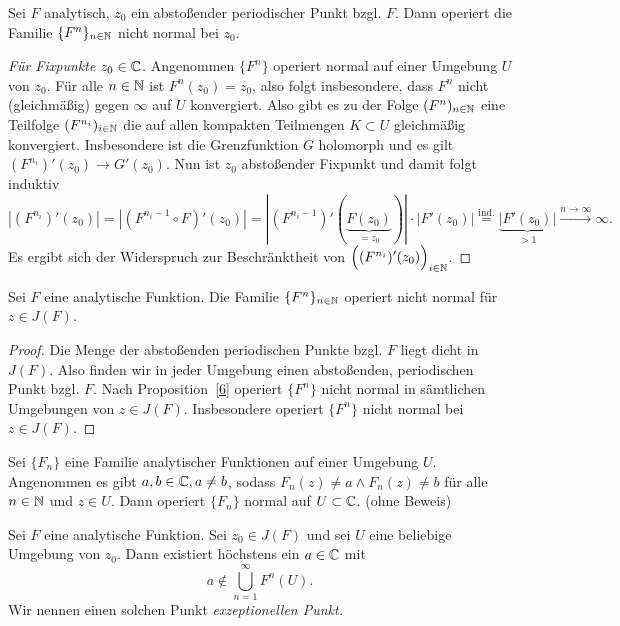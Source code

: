 \documentclass{mywork}
\begin{document}
\begin{prop}\label{6}
Sei $F$ analytisch, $z_0$ ein abstoßender periodischer Punkt bzgl. $F$. Dann operiert die Familie $\{F^n\}_{n\in \mathbb{N}}$ nicht normal bei $z_0$.
\end{prop}
\begin{proof}[Für Fixpunkte $z_0\in \mathbb{C}$]
 Angenommen $\{F^n\}$ operiert normal auf einer Umgebung $U$ von $z_0$. Für alle $n\in \mathbb{N}$ ist $F^n(z_0)=z_0$, also folgt insbesondere, dass $F^n$ nicht (gleichmäßig) gegen $\infty$ auf $U$ konvergiert. Also gibt es zu der Folge $(F^n)_{n\in \mathbb{N}}$ eine Teilfolge $(F^{n_i})_{i\in \mathbb{N}}$ die auf allen kompakten Teilmengen $K\subset U$ gleichmäßig konvergiert. Insbesondere ist die Grenzfunktion $G$ holomorph und es gilt $(F^{n_i})'(z_0) \to G'(z_0)$. Nun ist $z_0$ abstoßender Fixpunkt und damit folgt induktiv
 \[
 	|(F^{n_i})'(z_0)|=|(F^{n_i-1} \circ F)'(z_0)|=|(F^{n_i-1})'(\underbrace{F(z_0)}_{=z_0})|\cdot |F'(z_0)| \stackrel{\text{ind.}}{=} \underbrace{|F'(z_0)|}_{>1} \stackrel{n\to \infty}\to \infty.
 \]
 Es ergibt sich der Widerspruch zur Beschränktheit von $\Big((F^{n_i})'(z_0)\Big)_{i\in \mathbb{N}}$.
\end{proof}



\begin{kor} \label{7}
Sei $F$ eine analytische Funktion. Die Familie $\{F^n\}_{n\in \mathbb{N}}$ operiert nicht normal für $z\in J(F)$.
\end{kor}

\begin{proof}
Die Menge der abstoßenden periodischen Punkte bzgl. $F$ liegt dicht in $J(F)$. Also finden wir in jeder Umgebung einen abstoßenden, periodischen Punkt bzgl. $F$. Nach Proposition~\ref{6} operiert $\{F^n\}$ nicht normal in sämtlichen Umgebungen von $z\in J(F)$. Insbesondere operiert $\{F^n\}$ nicht normal bei $z\in J(F)$.
\end{proof}

\begin{thm} \label{8}
Sei $\{F_n\}$ eine Familie analytischer Funktionen auf einer Umgebung $U$. Angenommen es gibt $a,b \in \mathbb{C}, a\neq b$, sodass $F_n(z)\neq a \land F_n(z)\neq b$ für alle $n\in \mathbb{N}$ und $z\in U$. Dann operiert $\{F_n\}$ normal auf $U\subset \mathbb{C}$. (ohne Beweis) 
\end{thm}

\begin{kor} \label{9}
Sei $F$ eine analytische Funktion. Sei $z_0\in J(F)$ und sei $U$ eine beliebige Umgebung von $z_0$. Dann existiert höchstens ein $a\in \mathbb{C}$ mit
\[
	a\not\in \bigcup_{n=1}^\infty F^n(U).
\]
Wir nennen einen solchen Punkt \emph{exzeptionellen Punkt.}
\end{kor}
\end{document}
